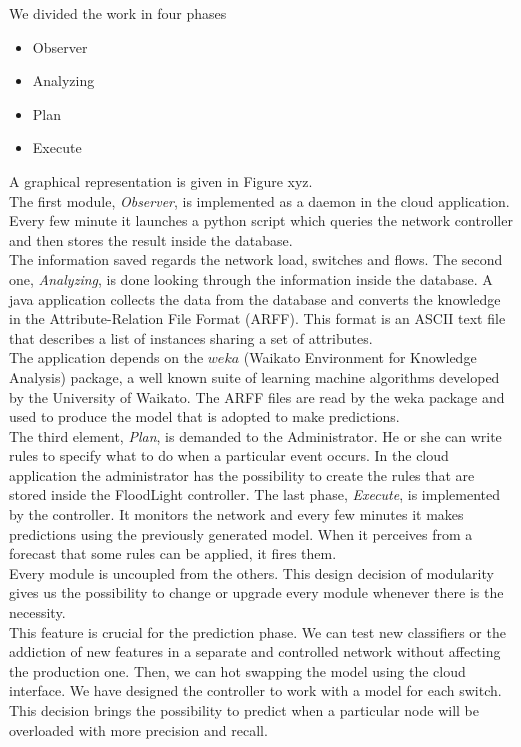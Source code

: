 \documentclass[12pt]{article}
\begin{document}
We divided the work in four phases
\begin{itemize}
	\item Observer
	\item Analyzing
	\item Plan
	\item Execute
\end{itemize}
A graphical representation is given in Figure xyz.\\
The first module, \textit{Observer}, is implemented as a daemon in the cloud application. 
Every few minute it launches a python script which queries the network controller and then stores the result inside the database.\\
The information saved regards the network load, switches and flows.
The second one, \textit{Analyzing}, is done looking through the information inside the database. 
A java application collects the data from the database and converts the knowledge in the Attribute-Relation File Format (ARFF). 
This format is an ASCII text file that describes a list of instances sharing a set of attributes.\\
The application depends on the $weka$ (Waikato Environment for Knowledge Analysis) package, a well known suite of learning machine algorithms developed by the University of Waikato.
The ARFF files are read by the weka package and used to produce the model that is adopted to make predictions.\\
The third element, \textit{Plan}, is demanded to the Administrator.
He or she can write rules to specify what to do when a particular event occurs.
In the cloud application the administrator has the possibility to create the rules that are stored inside the FloodLight controller.
The last phase, \textit{Execute}, is implemented by the controller. 
It monitors the network and every few minutes it makes predictions using the previously generated model.
When it perceives from a forecast that some rules can be applied, it fires them.\\
Every module is uncoupled from the others. This design decision of modularity gives us the possibility to change or upgrade every module whenever there is the necessity.\\



This feature is crucial for the prediction phase. We can test new classifiers or the addiction of new features in a separate and controlled network without affecting the production one. Then, we can hot swapping the model using the cloud interface.
We have designed the controller to work with a model for each switch. This decision brings the possibility to predict when a particular node will be overloaded with more precision and recall.\\
\end{document}
